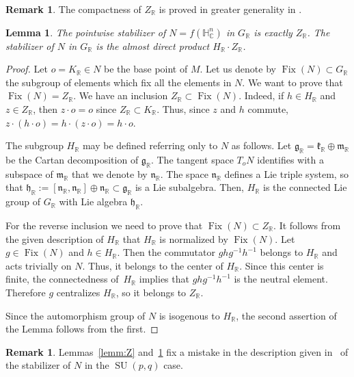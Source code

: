 \documentclass[10pt]{amsart}
\newcommand{\citestar}[3]{\cite[#3]{#1}}
\theoremstyle{plain}
\newtheorem{lemm}[theo]{Lemma}
\theoremstyle{definition}
\newtheorem{rema}[theo]{Remark}
\DeclareMathOperator{\Fix}{Fix}
\DeclareMathOperator{\SU}{SU}
\newcommand{\bR}{\mathbb{R}}
\newcommand{\HC}{{\mathbb{H}^n_\mathbb{C}}}
\newcommand{\fgg}{\mathfrak{g}}
\newcommand{\fh}{\mathfrak{h}}
\newcommand{\fk}{\mathfrak{k}}
\newcommand{\fm}{\mathfrak{m}}
\newcommand{\fn}{\mathfrak{n}}
\begin{document}
\begin{rema}
\label{rema:compactness}
The compactness of $Z_\bR$ is proved in greater generality in \citestar{BIW}*{Cor.\,4}.
\end{rema}

\begin{lemm} \label{lemm:fixator}
The pointwise stabilizer of $N=f(\HC)$ in $G_\bR$ is exactly $Z_\bR$. The stabilizer of $N$ in $G_\bR$ is the
almost direct product $H_\bR\cdot Z_\bR$.
\end{lemm}
\begin{proof}
Let $o=K_\bR \in N$ be the base point of $M$.
Let us denote by $\Fix(N) \subset G_\bR$ the subgroup of elements which fix all the elements in $N$.
We want to prove that $\Fix(N)=Z_\bR$. We have an inclusion $Z_\bR \subset \Fix(N)$. Indeed, if $h \in H_\bR$ and
$z \in Z_\bR$, then $z\cdot o = o$ since $Z_\bR\subset K_\bR$. Thus, since $z$ and $h$ commute, $z
\cdot (h \cdot o) = h \cdot (z \cdot o) = h \cdot o$.

The subgroup $H_\bR$ may be defined referring only to $N$ as follows.
Let $\fgg_\bR = \fk_\bR \oplus \fm_\bR$ be the Cartan decomposition of $\fgg_\bR$. The tangent space
$T_oN$ identifies with a subspace of $\fm_\bR$ that we denote by $\fn_\bR$.
The space $\fn_\bR$ defines a Lie triple system, so that $\fh_\bR:= [\fn_\bR,\fn_\bR] \oplus \fn_\bR
\subset \fgg_\bR$ is a Lie subalgebra. Then, $H_\bR$ is the connected Lie group of $G_\bR$
with Lie algebra $\fh_\bR$.

For the reverse inclusion we need to prove that $\Fix(N) \subset Z_\bR$.
It follows from the given description of $H_\bR$ that $H_\bR$ is normalized by $\Fix(N)$.
Let $g \in \Fix(N)$ and $h \in H_\bR$. Then the commutator
$ghg^{-1}h^{-1}$ belongs to $H_\bR$ and acts trivially on $N$. Thus, it belongs to the center of
$H_\bR$. Since this center is finite, the connectedness of~$H_\bR$ implies that $ghg^{-1}h^{-1}$ is the neutral element. Therefore $g$ centralizes $H_\bR$, so
it belongs to $Z_\bR$.

Since the automorphism group of $N$ is isogenous to $H_\bR$, the second assertion of the Lemma
follows from the first.
\end{proof}

\begin{rema}
Lemmas~\ref{lemm:Z} and~\ref{lemm:fixator} fix a mistake in the description given
in~\citestar{KMrank2}*{.2} of the stabilizer of $N$ in the $\SU(p,q)$ case.
\end{rema}
\end{document}
